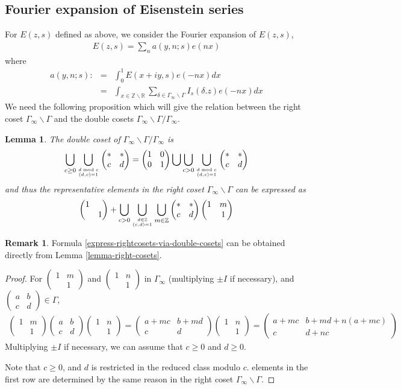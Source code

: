 \documentclass[11pt,reqno]{amsart}
\newcommand{\bea}{\begin{eqnarray}}
\newcommand{\eea}{\end{eqnarray}}
\newcommand{\bna}{\begin{eqnarray*}}
\newcommand{\ena}{\end{eqnarray*}}
\newcommand{\bma}{\begin{pmatrix}}
\newcommand{\ema}{\end{pmatrix}}
\def\R{\mathbb{R}}
\def\Z{\mathbb{Z}}
\newtheorem{lemma}{Lemma}[section]
\theoremstyle{definition}
\newtheorem{remark}{Remark}
\begin{document}
\subsection{Fourier expansion of Eisenstein series}
For $E(z,s)$ defined as above, we consider the Fourier expansion of $E(z,s)$,
\bna
E(z,s)=\sum_n
a(y,n;s) e(nx)
\ena
where
\bna
a(y,n;s):&=&\int_{0}^1 E(x+iy,s)e(-nx)dx\\
&=&\int_{x\in \Z\backslash \R}\sum_{\delta \in \Gamma_\infty\backslash \Gamma}
I_s\left(\delta.z\right)e(-nx)dx
\ena
We need the following proposition which will give the relation
between the right coset $\Gamma_\infty\backslash\Gamma$ and the double cosets
$\Gamma_\infty\backslash\Gamma/\Gamma_\infty$.
\begin{lemma}\label{lemma-doublecoset}
The double coset of $\Gamma_\infty\backslash\Gamma/\Gamma_\infty$ is
\bna
\bigcup_{c\geq 0}\bigcup_{d\bmod c\atop{(d,c)=1}}\bma *&*\\c&d\ema
=\bma 1&0\\0&1\ema\bigcup \bigcup_{c>0}\bigcup_{d\bmod c\atop(d,c)=1}\bma *&*\\c&d\ema
\ena
and thus the representative elements in the right coset $\Gamma_\infty\backslash\Gamma$
can be expressed as
\bea
\bma 1\\&1\ema + \bigcup_{c>0}\bigcup_{d\in\Z\atop(c,d)=1}\bigcup_{m\in\Z}\bma *&*\\ c&d\ema
\bma 1&m\\&1\ema\label{express-rightcosets-via-double-cosets}
\eea
\end{lemma}
\begin{remark}
Formula \eqref{express-rightcosets-via-double-cosets} can be obtained directly from
Lemma \ref{lemma-right-cosets}.
\end{remark}
\begin{proof}
For $\bma 1&m\\&1\ema$ and $\bma 1&n \\&1\ema$ in $\Gamma_\infty$ (multiplying $\pm I$
if necessary), and $\bma a&b\\c&d\ema\in\Gamma$,
\bna
\bma 1&m\\&1\ema\bma a&b\\c&d\ema \bma 1&n\\&1\ema
=\bma a+mc&b+md\\c&d\ema\bma 1&n\\&1\ema=\bma a+mc& b+md+n(a+mc)\\ c& d+nc\ema
\ena
Multiplying $\pm I$ if necessary, we can assume that $c\geq 0$ and $d\geq 0$.

Note that $c\geq 0$, and $d$ is restricted in the reduced class modulo $c$.
elements in the first row are determined by the same reason in the right coset $\Gamma_\infty\backslash\Gamma$.
\end{proof}
\end{document}
